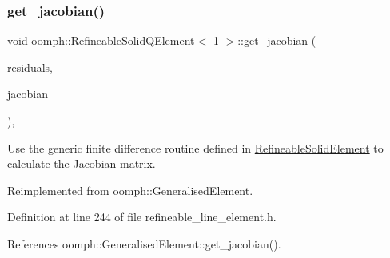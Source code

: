 \mbox{\label{classoomph_1_1RefineableSolidQElement_3_011_01_4_a61a037cc3669af9204c9fa764e5c7081}} 
\subsubsection{\texorpdfstring{get\+\_\+jacobian()}{get\_jacobian()}}
{\footnotesize\ttfamily void \hyperlink{classoomph_1_1RefineableSolidQElement}{oomph\+::\+Refineable\+Solid\+Q\+Element}$<$ 1 $>$\+::get\+\_\+jacobian (\begin{DoxyParamCaption}\item[{\hyperlink{classoomph_1_1Vector}{Vector}$<$ double $>$ \&}]{residuals,  }\item[{\hyperlink{classoomph_1_1DenseMatrix}{Dense\+Matrix}$<$ double $>$ \&}]{jacobian }\end{DoxyParamCaption})\hspace{0.3cm}{\ttfamily [inline]}, {\ttfamily [virtual]}}



Use the generic finite difference routine defined in \hyperlink{classoomph_1_1RefineableSolidElement}{Refineable\+Solid\+Element} to calculate the Jacobian matrix. 



Reimplemented from \hyperlink{classoomph_1_1GeneralisedElement_ab915bdad7e6643e5e73a6d98bc7cf48e}{oomph\+::\+Generalised\+Element}.



Definition at line 244 of file refineable\+\_\+line\+\_\+element.\+h.



References oomph\+::\+Generalised\+Element\+::get\+\_\+jacobian().

\mbox{\label{classoomph_1_1RefineableSolidQElement_3_011_01_4_ae0cd264bee16dd1d05d35f79e33dd408}} 
